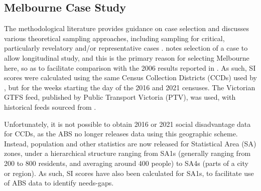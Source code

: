 \documentclass[preprint, 3p,
authoryear]{elsarticle} %
\begin{document}
\subsection{Melbourne Case Study}\label{melbourne-case-study}

The methodological literature provides guidance on case selection and
discusses various theoretical sampling approaches, including sampling
for critical, particularly revelatory and/or representative cases
\citep{Eisenhardt1989aa, Yin2009aa, Denscombe2007aa, Eisenhardt2007TBfC}.
\citet{Yin2009aa} notes selection of a case to allow longitudinal study,
and this is the primary reason for selecting Melbourne here, so as to
facilitate comparison with the 2006 results reported in
\citet{currie2010identifying}. As such, SI scores were calculated using
the same Census Collection Districts (CCDs) used by
\citet{currie2010identifying}, but for the weeks starting the day of the
2016 and 2021 censuses. The Victorian GTFS feed, published by Public
Transport Victoria (PTV), was used, with historical feeds sourced from
\citet{transitfeeds_victoria:2023aa}.

Unfortunately, it is not possible to obtain 2016 or 2021 social
disadvantage data for CCDs, as the ABS no longer releases data using
this geographic scheme. Instead, population and other statistics are now
released for Statistical Area (SA) zones, under a hierarchical structure
ranging from SA1s (generally ranging from 200 to 800 residents, and
averaging around 400 people) to SA4s (parts of a city or
region)\citep{ABSmaps}. As such, SI scores have also been calculated for
SA1s, to facilitate use of ABS data to identify needs-gaps.
\end{document}
